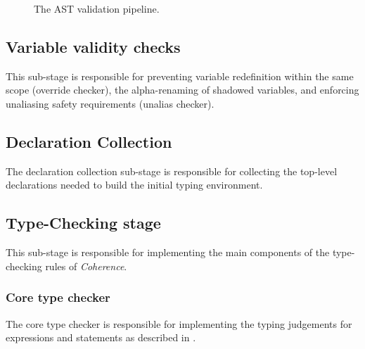 \begin{figure}[H]
{%
}
\caption{The AST validation pipeline.} 
\label{fig:ast-validation}
\end{figure}

\subsection{Variable validity checks} \label{sec:var-validity}
This sub-stage is responsible for preventing variable redefinition within the same scope (override checker), the alpha-renaming of shadowed variables, and enforcing unaliasing safety requirements (unalias checker).

\subsection{Declaration Collection}
The declaration collection sub-stage is responsible for collecting the top-level declarations needed to build the initial typing environment.

\subsection{Type-Checking stage}
This sub-stage is responsible for implementing the main components of the type-checking rules of \textit{Coherence}.

\subsubsection*{Core type checker}
The core type checker is responsible for implementing the typing judgements for expressions and statements as described in .

